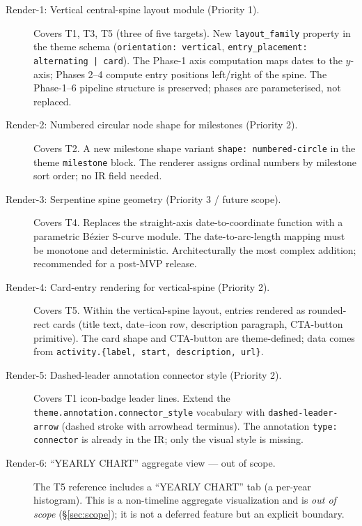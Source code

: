 \begin{description}
  \item[Render-1: Vertical central-spine layout module (Priority 1).]
        Covers T1, T3, T5 (three of five targets). New \texttt{layout\_family} property
        in the theme schema (\texttt{orientation: vertical},
        \texttt{entry\_placement: alternating | card}). The Phase-1 axis computation
        maps dates to the $y$-axis; Phases 2--4 compute entry positions left/right of
        the spine. The Phase-1--6 pipeline structure is preserved; phases are
        parameterised, not replaced.

  \item[Render-2: Numbered circular node shape for milestones (Priority 2).]
        Covers T2. A new milestone shape variant \texttt{shape: numbered-circle} in the
        theme \texttt{milestone} block. The renderer assigns ordinal numbers by
        milestone sort order; no IR field needed.

  \item[Render-3: Serpentine spine geometry (Priority 3 / future scope).]
        Covers T4. Replaces the straight-axis date-to-coordinate function with a
        parametric B\'{e}zier S-curve module. The date-to-arc-length mapping must be
        monotone and deterministic. Architecturally the most complex addition; recommended
        for a post-MVP release.

  \item[Render-4: Card-entry rendering for vertical-spine (Priority 2).]
        Covers T5. Within the vertical-spine layout, entries rendered as rounded-rect
        cards (title text, date--icon row, description paragraph, CTA-button primitive).
        The card shape and CTA-button are theme-defined; data comes from
        \texttt{activity.\{label, start, description, url\}}.

  \item[Render-5: Dashed-leader annotation connector style (Priority 2).]
        Covers T1 icon-badge leader lines. Extend the
        \texttt{theme.annotation.connector\_style} vocabulary with
        \texttt{dashed-leader-arrow} (dashed stroke with arrowhead terminus). The
        annotation \texttt{type: connector} is already in the IR; only the visual
        style is missing.

  \item[Render-6: ``YEARLY CHART'' aggregate view --- out of scope.]
        The T5 reference includes a ``YEARLY CHART'' tab (a per-year histogram). This
        is a non-timeline aggregate visualization and is \emph{out of scope}
        (\S\ref{sec:scope}); it is not a deferred feature but an explicit boundary.
\end{description}

